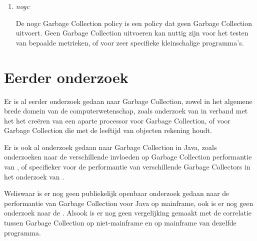 \begin{enumerate}
    \item \textit{nogc}
    
            De nogc Garbage Collection policy is een policy dat geen Garbage Collection uitvoert.
            Geen Garbage Collection uitvoeren kan nuttig zijn voor het testen van bepaalde metrieken, of voor zeer specifieke kleinschalige programma's.
        

\end{enumerate}


\section{Eerder onderzoek}
\label{sec:eerderonderzoek}
Er is al eerder onderzoek gedaan naar Garbage Collection, zowel in het algemene brede domein van de computerwetenschap, zoals onderzoek van \textcite{Dijkstra1978} in verband met het het creëren van een aparte processor voor Garbage Collection, of \textcite{Lieberman1981} voor Garbage Collection die met de leeftijd van objecten rekening houdt.


Er is ook al onderzoek gedaan naar Garbage Collection in Java, zoals onderzoeken naar de verschillende invloeden op Garbage Collection performantie van \textcite{Dijkstra1978}, of specifieker voor de performantie van verschillende Garbage Collectors in het onderzoek van \textcite{Grgic2018}.


Weliswaar is er nog geen publiekelijk openbaar onderzoek gedaan naar de performantie van Garbage Collection voor Java op mainframe, ook is er nog geen onderzoek naar de .
Alsook is er nog geen vergelijking gemaakt met de correlatie tussen Garbage Collection op niet-mainframe en op mainframe van dezelfde programma.
